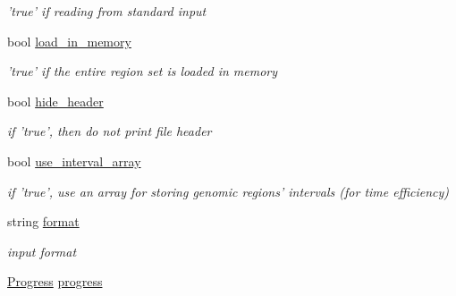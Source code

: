 \begin{DoxyCompactItemize}
\begin{DoxyCompactList}\small\item\em 'true' if reading from standard input \end{DoxyCompactList}\item 
\hypertarget{classGenomicRegionSet_ade43c6cd72b95da75395129b00a52687}{
bool \hyperlink{classGenomicRegionSet_ade43c6cd72b95da75395129b00a52687}{load\_\-in\_\-memory}}
\label{classGenomicRegionSet_ade43c6cd72b95da75395129b00a52687}

\begin{DoxyCompactList}\small\item\em 'true' if the entire region set is loaded in memory \end{DoxyCompactList}\item 
\hypertarget{classGenomicRegionSet_a84dd2f8055524a933e963175781f7fd2}{
bool \hyperlink{classGenomicRegionSet_a84dd2f8055524a933e963175781f7fd2}{hide\_\-header}}
\label{classGenomicRegionSet_a84dd2f8055524a933e963175781f7fd2}

\begin{DoxyCompactList}\small\item\em if 'true', then do not print file header \end{DoxyCompactList}\item 
\hypertarget{classGenomicRegionSet_aea8b5c9bae036da50d4e8720d2e13231}{
bool \hyperlink{classGenomicRegionSet_aea8b5c9bae036da50d4e8720d2e13231}{use\_\-interval\_\-array}}
\label{classGenomicRegionSet_aea8b5c9bae036da50d4e8720d2e13231}

\begin{DoxyCompactList}\small\item\em if 'true', use an array for storing genomic regions' intervals (for time efficiency) \end{DoxyCompactList}\item 
\hypertarget{classGenomicRegionSet_aa4494ed2ae3f7594c29b18c39fed6748}{
string \hyperlink{classGenomicRegionSet_aa4494ed2ae3f7594c29b18c39fed6748}{format}}
\label{classGenomicRegionSet_aa4494ed2ae3f7594c29b18c39fed6748}

\begin{DoxyCompactList}\small\item\em input format \end{DoxyCompactList}\item 
\hypertarget{classGenomicRegionSet_a08d9a35a7688ac2c193b53c9a8693c6e}{
\hyperlink{classProgress}{Progress} \hyperlink{classGenomicRegionSet_a08d9a35a7688ac2c193b53c9a8693c6e}{progress}}
\label{classGenomicRegionSet_a08d9a35a7688ac2c193b53c9a8693c6e}


\end{DoxyCompactItemize}
